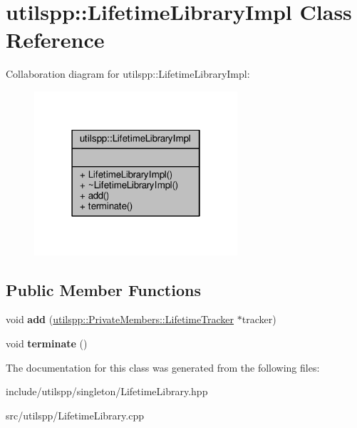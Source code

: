 \hypertarget{classutilspp_1_1LifetimeLibraryImpl}{\section{utilspp\-:\-:Lifetime\-Library\-Impl Class Reference}
\label{classutilspp_1_1LifetimeLibraryImpl}
}


Collaboration diagram for utilspp\-:\-:Lifetime\-Library\-Impl\-:\nopagebreak
\begin{figure}[H]
\begin{center}
\leavevmode
\includegraphics[width=214pt]{classutilspp_1_1LifetimeLibraryImpl__coll__graph}
\end{center}
\end{figure}
\subsection*{Public Member Functions}
\begin{DoxyCompactItemize}
\item 
\hypertarget{classutilspp_1_1LifetimeLibraryImpl_a624b36a3c2929a414ed61950681408dc}{void {\bfseries add} (\hyperlink{classutilspp_1_1PrivateMembers_1_1LifetimeTracker}{utilspp\-::\-Private\-Members\-::\-Lifetime\-Tracker} $\ast$tracker)}\label{classutilspp_1_1LifetimeLibraryImpl_a624b36a3c2929a414ed61950681408dc}

\item 
\hypertarget{classutilspp_1_1LifetimeLibraryImpl_af4335b572c6c3369049e68f4d9612267}{void {\bfseries terminate} ()}\label{classutilspp_1_1LifetimeLibraryImpl_af4335b572c6c3369049e68f4d9612267}

\end{DoxyCompactItemize}


The documentation for this class was generated from the following files\-:\begin{DoxyCompactItemize}
\item 
include/utilspp/singleton/Lifetime\-Library.\-hpp\item 
src/utilspp/Lifetime\-Library.\-cpp\end{DoxyCompactItemize}

